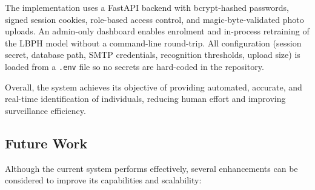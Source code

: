 \documentclass[11pt]{report}
\begin{document}
The implementation uses a FastAPI backend with bcrypt-hashed passwords, signed session cookies, role-based access control, and magic-byte-validated photo uploads. An admin-only dashboard enables enrolment and in-process retraining of the LBPH model without a command-line round-trip. All configuration (session secret, database path, SMTP credentials, recognition thresholds, upload size) is loaded from a \texttt{.env} file so no secrets are hard-coded in the repository.

Overall, the system achieves its objective of providing automated, accurate, and real-time identification of individuals, reducing human effort and improving surveillance efficiency.

\subsection{Future Work}\label{sec:future-work}

Although the current system performs effectively, several enhancements can be considered to improve its capabilities and scalability:
\end{document}
